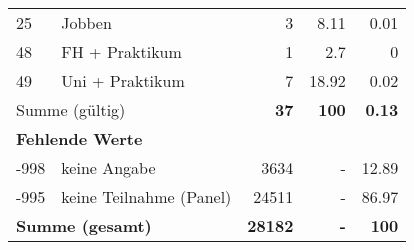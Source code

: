 \begin{longtable}{lXrrr}
     25 &
     \multicolumn{1}{X}{ Jobben   } &


       \num{3} &
       \num[round-mode=places,round-precision=2]{8.11} &
         \num[round-mode=places,round-precision=2]{0.01} \\

     48 &
     \multicolumn{1}{X}{ FH + Praktikum   } &


       \num{1} &
       \num[round-mode=places,round-precision=2]{2.7} &
         \num[round-mode=places,round-precision=2]{0} \\

     49 &
     \multicolumn{1}{X}{ Uni + Praktikum   } &


       \num{7} &
       \num[round-mode=places,round-precision=2]{18.92} &
         \num[round-mode=places,round-precision=2]{0.02} \\
     \midrule
     \multicolumn{2}{l}{Summe (gültig)} &
       \textbf{\num{37}} &
     \textbf{\num{100}} &
       \textbf{\num[round-mode=places,round-precision=2]{0.13}} \\
     \multicolumn{5}{l}{\textbf{Fehlende Werte}}\\
       -998 &
       keine Angabe &
         \num{3634} &
        - &
         \num[round-mode=places,round-precision=2]{12.89} \\
       -995 &
       keine Teilnahme (Panel) &
         \num{24511} &
        - &
         \num[round-mode=places,round-precision=2]{86.97} \\
     \midrule
     \multicolumn{2}{l}{\textbf{Summe (gesamt)}} &
          \textbf{\num{28182}} &
        \textbf{-} &
        \textbf{\num{100}} \\
     \bottomrule
     \end{longtable}
     
